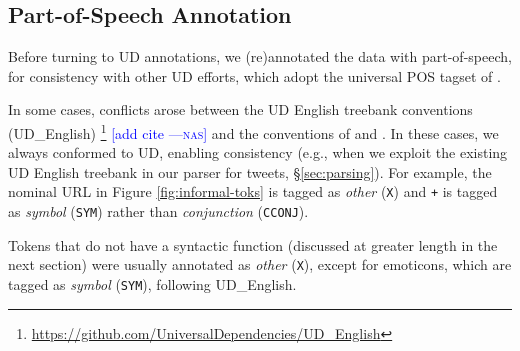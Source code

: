 \documentclass[11pt,a4paper]{article}
\newcommand{\heart}{\ensuremath\heartsuit}
\newcommand{\yjcomment}[1]{\textcolor{orange}{[$_\mathrm{L}^\mathrm{Y}$#1]}}
\newcommand{\nascomment}[1]{\textcolor{blue}{[#1 ---\textsc{nas}]}}
\begin{document}
\subsection{Part-of-Speech Annotation}\label{sec:pos-anno}

Before turning to UD annotations, we (re)annotated the data with 
part-of-speech, for consistency with other UD efforts,
which adopt the universal POS tagset of .

In some cases, conflicts arose between the UD English 
treebank conventions (UD\_English)
\footnote{\url{https://github.com/UniversalDependencies/UD_English}}
\nascomment{add cite}
and the conventions of  and
.  In these cases, we always
conformed to UD, enabling consistency (e.g., when we exploit the
existing UD English treebank in our parser for tweets, \S\ref{sec:parsing}).  For example,  
the nominal URL in Figure \ref{fig:informal-toks} is tagged as {\it
  other} ({\tt X}) and {\tt +} is tagged as {\it symbol} ({\tt SYM})
rather than {\it conjunction} ({\tt CCONJ}).  

Tokens that do not have a syntactic function (discussed at greater
length in the next section) were usually annotated as \emph{other}
(\texttt{X}), except for emoticons, which are tagged as \emph{symbol}
(\texttt{SYM}), following UD\_English.  

\end{document}
